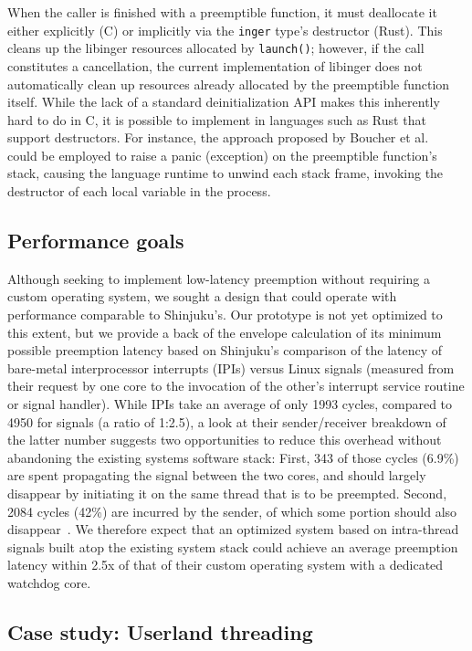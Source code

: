 When the caller is finished with a preemptible function, it must deallocate it
either explicitly (C) or implicitly via the \texttt{inger} type's destructor
(Rust).  This cleans up the libinger resources allocated by \texttt{launch()};
however, if the call constitutes a cancellation, the current implementation of
libinger does not automatically clean up resources already allocated by the
preemptible function itself.  While the lack of a standard deinitialization API
makes this inherently hard to do in C, it is possible to implement in languages
such as Rust that support destructors.  For instance, the approach proposed by
Boucher et al.~\cite{boucher:atc2018} could be employed to raise a panic
(exception) on the preemptible function's stack, causing the language runtime
to unwind each stack frame, invoking the destructor of each local variable in
the process.


\subsection{Performance goals}

Although seeking to implement low-latency preemption without requiring a custom
operating system, we sought a design that could operate with performance
comparable to Shinjuku's.  Our prototype is not yet optimized to this extent,
but we provide a back of the envelope calculation of its minimum possible
preemption latency based on Shinjuku's comparison of the latency of bare-metal
interprocessor interrupts (IPIs) versus Linux signals (measured from their
request by one core to the invocation of the other's interrupt service routine
or signal handler).  While IPIs take an average of only 1993 cycles, compared
to 4950 for signals (a ratio of 1:2.5), a look at their sender/receiver
breakdown of the latter number suggests two opportunities to reduce this
overhead without abandoning the existing systems software stack:  First, 343 of
those cycles (6.9\%) are spent propagating the signal between the two cores,
and should largely disappear by initiating it on the same thread that is to be
preempted.  Second, 2084 cycles (42\%) are incurred by the sender, of which
some portion should also disappear~\cite{Kaffes:nsdi2019}.  We therefore expect
that an optimized system based on intra-thread signals built atop the existing
system stack could achieve an average preemption latency within 2.5x of that of
their custom operating system with a dedicated watchdog core.


\subsection{Case study: Userland threading}
\label{sec:threading}
